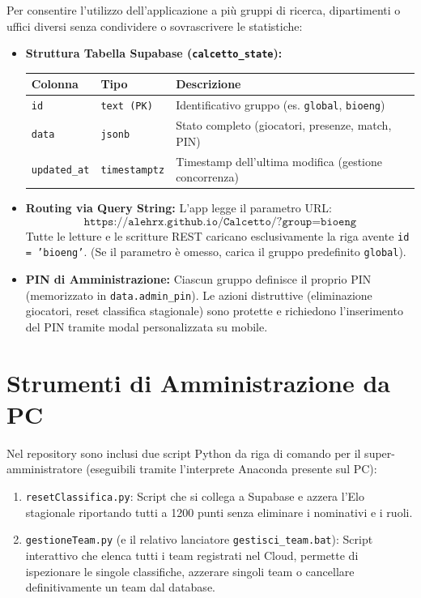 \documentclass[11pt,a4paper]{article}
\begin{document}
Per consentire l'utilizzo dell'applicazione a pi\`u gruppi di ricerca, dipartimenti o uffici diversi senza condividere o sovrascrivere le statistiche:
\begin{itemize}
    \item \textbf{Struttura Tabella Supabase (\texttt{calcetto\_state}):}
    \begin{center}
    \begin{tabular}{lll}
    \toprule
    \textbf{Colonna} & \textbf{Tipo} & \textbf{Descrizione} \\
    \midrule
    \texttt{id} & \texttt{text (PK)} & Identificativo gruppo (es. \texttt{global}, \texttt{bioeng}) \\
    \texttt{data} & \texttt{jsonb} & Stato completo (giocatori, presenze, match, PIN) \\
    \texttt{updated\_at} & \texttt{timestamptz} & Timestamp dell'ultima modifica (gestione concorrenza) \\
    \bottomrule
    \end{tabular}
    \end{center}
    \item \textbf{Routing via Query String:} L'app legge il parametro URL:
    \[ \texttt{https://alehrx.github.io/Calcetto/?group=bioeng} \]
    Tutte le letture e le scritture REST caricano esclusivamente la riga avente \texttt{id = 'bioeng'}. (Se il parametro \`e omesso, carica il gruppo predefinito \texttt{global}).
    \item \textbf{PIN di Amministrazione:} Ciascun gruppo definisce il proprio PIN (memorizzato in \texttt{data.admin\_pin}). Le azioni distruttive (eliminazione giocatori, reset classifica stagionale) sono protette e richiedono l'inserimento del PIN tramite modal personalizzata su mobile.
\end{itemize}

\section{Strumenti di Amministrazione da PC}

Nel repository sono inclusi due script Python da riga di comando per il super-amministratore (eseguibili tramite l'interprete Anaconda presente sul PC):
\begin{enumerate}
    \item \texttt{resetClassifica.py}: Script che si collega a Supabase e azzera l'Elo stagionale riportando tutti a 1200 punti senza eliminare i nominativi e i ruoli.
    \item \texttt{gestioneTeam.py} (e il relativo lanciatore \texttt{gestisci\_team.bat}): Script interattivo che elenca tutti i team registrati nel Cloud, permette di ispezionare le singole classifiche, azzerare singoli team o cancellare definitivamente un team dal database.
\end{enumerate}
\end{document}
